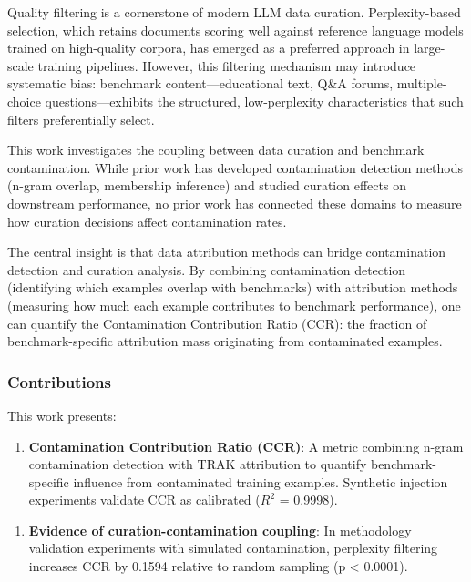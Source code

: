 
Quality filtering is a cornerstone of modern LLM data curation. Perplexity-based selection, which retains documents scoring well against reference language models trained on high-quality corpora, has emerged as a preferred approach in large-scale training pipelines. However, this filtering mechanism may introduce systematic bias: benchmark content---educational text, Q\&A forums, multiple-choice questions---exhibits the structured, low-perplexity characteristics that such filters preferentially select.

This work investigates the coupling between data curation and benchmark contamination. While prior work has developed contamination detection methods (n-gram overlap, membership inference) and studied curation effects on downstream performance, no prior work has connected these domains to measure how curation decisions affect contamination rates.

The central insight is that data attribution methods can bridge contamination detection and curation analysis. By combining contamination detection (identifying which examples overlap with benchmarks) with attribution methods (measuring how much each example contributes to benchmark performance), one can quantify the Contamination Contribution Ratio (CCR): the fraction of benchmark-specific attribution mass originating from contaminated examples.

\subsubsection{Contributions}

This work presents:

\begin{enumerate}
\item \textbf{Contamination Contribution Ratio (CCR)}: A metric combining n-gram contamination detection with TRAK attribution to quantify benchmark-specific influence from contaminated training examples. Synthetic injection experiments validate CCR as calibrated ($R^2$ = 0.9998).
\end{enumerate}

\begin{enumerate}
\item \textbf{Evidence of curation-contamination coupling}: In methodology validation experiments with simulated contamination, perplexity filtering increases CCR by 0.1594 relative to random sampling (p < 0.0001).
\end{enumerate}

